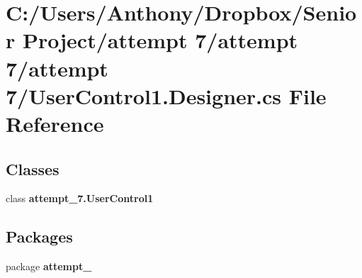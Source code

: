 \section{C:/Users/Anthony/Dropbox/Senior Project/attempt 7/attempt 7/attempt 7/UserControl1.Designer.cs File Reference}
\label{_user_control1_8_designer_8cs}
\subsection*{Classes}
\begin{DoxyCompactItemize}
\item 
class {\bf attempt\_\-7.UserControl1}
\end{DoxyCompactItemize}
\subsection*{Packages}
\begin{DoxyCompactItemize}
\item 
package {\bf attempt\_}
\end{DoxyCompactItemize}
